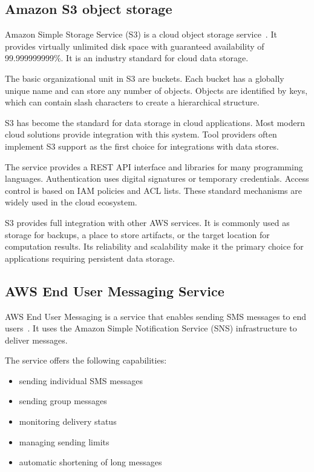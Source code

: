 \subsection{Amazon S3 object storage}

Amazon Simple Storage Service (S3) is a cloud object storage service~\cite{aws_s3}.
It provides virtually unlimited disk space with guaranteed availability of 99.999999999\%.
It is an industry standard for cloud data storage.

The basic organizational unit in S3 are buckets.
Each bucket has a globally unique name and can store any number of objects.
Objects are identified by keys, which can contain slash characters to create a hierarchical structure.

S3 has become the standard for data storage in cloud applications.
Most modern cloud solutions provide integration with this system.
Tool providers often implement S3 support as the first choice for integrations with data stores.

The service provides a REST API interface and libraries for many programming languages.
Authentication uses digital signatures or temporary credentials.
Access control is based on IAM policies and ACL lists.
These standard mechanisms are widely used in the cloud ecosystem.

S3 provides full integration with other AWS services.
It is commonly used as storage for backups, a place to store artifacts, or the target location for computation results.
Its reliability and scalability make it the primary choice for applications requiring persistent data storage.

\subsection{AWS End User Messaging Service}

AWS End User Messaging is a service that enables sending SMS messages to end users~\cite{aws_messaging}.
It uses the Amazon Simple Notification Service (SNS) infrastructure to deliver messages.

The service offers the following capabilities:
\begin{itemize}
    \item sending individual SMS messages
    \item sending group messages
    \item monitoring delivery status
    \item managing sending limits
    \item automatic shortening of long messages
\end{itemize}

